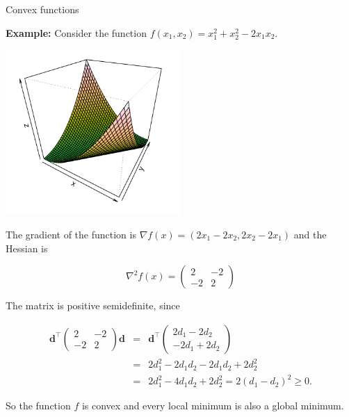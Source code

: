 \begin{vbframe}{Convex functions}

\textbf{Example:} Consider the function $f(x_1, x_2) = x_1^2 + x_2^2 - 2x_1x_2$.

\begin{center}
	\includegraphics[width = 0.5\textwidth]{figure_man/convex-example.png}
\end{center}



The gradient of the function is $\nabla f(x) = (2x_1 - 2x_2, 2x_2 - 2x_1)$ and the Hessian is

$$
\nabla^2 f(x) = \begin{pmatrix} 2 & -2 \\ -2 & 2 \end{pmatrix}
$$

\lz

The matrix is positive semidefinite, since

\begin{eqnarray*}
\mathbf{d}^{\top}\begin{pmatrix} 2 & -2 \\ -2 & 2 \end{pmatrix}\mathbf{d} &=& \mathbf{d}^{\top} \begin{pmatrix} 2d_1 - 2d_2 \\ -2d_1 + 2d_2\end{pmatrix} \\ &=& 2d_1^2 - 2d_1d_2 -2d_1d_2 + 2d_2^2 \\ &=& 2d_1^2 - 4d_1d_2 + 2d_2^2 = 2 (d_1 - d_2)^2 \ge 0.
\end{eqnarray*}

So the function $f$ is convex and every local minimum is also a global minimum.

\end{vbframe}



